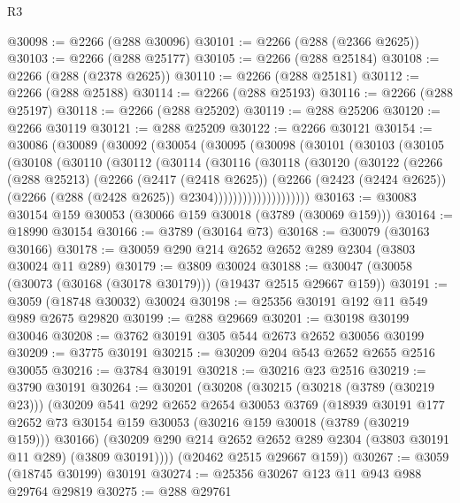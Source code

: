 \begin{lexlean}{R3}
\begin{coremodule}
@30098 := @2266 (@288 @30096)
@30101 := @2266 (@288 (@2366 @2625))
@30103 := @2266 (@288 @25177)
@30105 := @2266 (@288 @25184)
@30108 := @2266 (@288 (@2378 @2625))
@30110 := @2266 (@288 @25181)
@30112 := @2266 (@288 @25188)
@30114 := @2266 (@288 @25193)
@30116 := @2266 (@288 @25197)
@30118 := @2266 (@288 @25202)
@30119 := @288 @25206
@30120 := @2266 @30119
@30121 := @288 @25209
@30122 := @2266 @30121
@30154 := @30086
    (@30089
      (@30092
        (@30054
          (@30095
            (@30098
              (@30101
                (@30103
                  (@30105
                    (@30108
                      (@30110
                        (@30112
                          (@30114
                            (@30116
                              (@30118
                                (@30120
                                  (@30122
                                    (@2266
                                      (@288 @25213)
                                      (@2266
                                        (@2417 (@2418 @2625))
                                        (@2266
                                          (@2423 (@2424 @2625))
                                          (@2266 (@288 (@2428 @2625)) @2304))))))))))))))))))))
@30163 := @30083 @30154 @159 @30053 (@30066 @159 @30018 (@3789 (@30069 @159)))
@30164 := @18990 @30154
@30166 := @3789 (@30164 @73)
@30168 := @30079 (@30163 @30166)
@30178 := @30059 @290 @214 @2652 @2652 @289 @2304 (@3803 @30024 @11 @289)
@30179 := @3809 @30024
@30188 := @30047 (@30058 (@30073 (@30168 (@30178 @30179))) (@19437 @2515 @29667 @159))
@30191 := @3059 (@18748 @30032) @30024
@30198 := @25356 @30191 @192 @11 @549 @989 @2675 @29820
@30199 := @288 @29669
@30201 := @30198 @30199 @30046
@30208 := @3762 @30191 @305 @544 @2673 @2652 @30056 @30199
@30209 := @3775 @30191
@30215 := @30209 @204 @543 @2652 @2655 @2516 @30055
@30216 := @3784 @30191
@30218 := @30216 @23 @2516
@30219 := @3790 @30191
@30264 := @30201
    (@30208
      (@30215
        (@30218 (@3789 (@30219 @23)))
        (@30209
          @541
          @292
          @2652
          @2654
          @30053
          @3769
          (@18939
            @30191
            @177
            @2652
            @73
            @30154
            @159
            @30053
            (@30216 @159 @30018 (@3789 (@30219 @159)))
            @30166)
          (@30209 @290 @214 @2652 @2652 @289 @2304 (@3803 @30191 @11 @289) (@3809 @30191))))
      (@20462 @2515 @29667 @159))
@30267 := @3059 (@18745 @30199) @30191
@30274 := @25356 @30267 @123 @11 @943 @988 @29764 @29819
@30275 := @288 @29761

\end{coremodule}
\end{lexlean}
